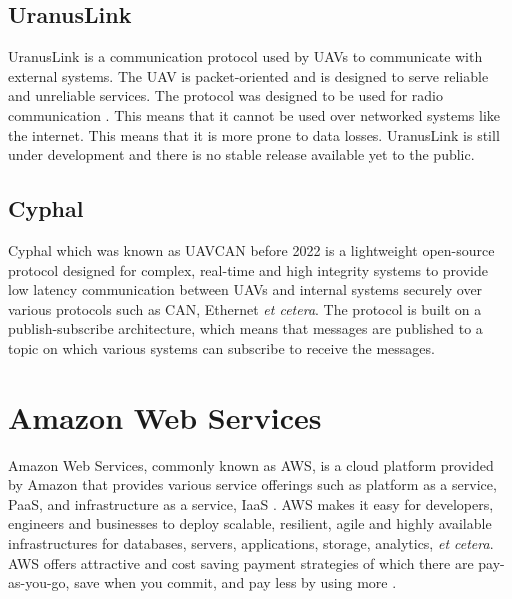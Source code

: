 \subsection{UranusLink}
\label{subsec:uranuslink}

UranusLink is a communication protocol used by UAVs to communicate with external systems. The UAV is packet-oriented and is designed to serve reliable and unreliable services. The protocol was designed to be used for radio communication \cite{Kriz2015}. This means that it cannot be used over networked systems like the internet. This means that it is more prone to data losses. UranusLink is still under development and there is no stable release available yet to the public.

\subsection{Cyphal}
\label{subsec:cyphal}

Cyphal which was known as UAVCAN before 2022 is a lightweight open-source protocol designed for complex, real-time and high integrity systems to provide low latency communication between UAVs and internal systems securely over various protocols such as CAN, Ethernet \textit{et cetera}. The protocol is built on a publish-subscribe architecture, which means that messages are published to a topic on which various systems can subscribe to receive the messages. \cite{cyphaldocumentation}



\section{Amazon Web Services}
\label{sec:aws}

Amazon Web Services, commonly known as AWS, is a cloud platform provided by Amazon that provides various service offerings such as platform as a service, PaaS, and infrastructure as a service, IaaS \cite{awswhatisaws2022}. AWS makes it easy for developers, engineers and businesses to deploy scalable, resilient, agile and highly available infrastructures for databases, servers, applications, storage, analytics, \textit{et cetera}. AWS offers attractive and cost saving payment strategies of which there are pay-as-you-go, save when you commit, and pay less by using more \cite{awspricing2022}.

